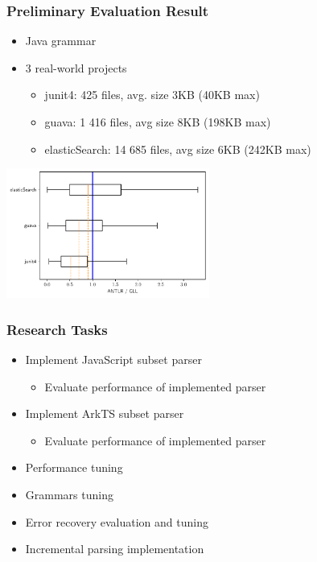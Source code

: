 \documentclass[xcolor=table,aspectratio=169]{beamer}
\begin{document}
\begin{frame}[fragile]
  \frametitle{Preliminary Evaluation Result}  
  \begin{itemize}
    \item Java grammar
    \item 3 real-world projects
    \begin{itemize}
      \item junit4: 425 files, avg. size 3KB (40KB max)
      \item guava:  1 416 files, avg size 8KB (198KB max)
      \item elasticSearch: 14 685 files, avg size 6KB (242KB max)
    \end{itemize}
  \end{itemize}
  \begin{center}
    \includegraphics[width=0.5\textwidth]{pictures/gll_results.pdf}
  \end{center}
  
\end{frame}

\begin{frame}[fragile]
  \frametitle{Research Tasks}  
  \begin{itemize}
    \item Implement JavaScript subset parser 
    \begin{itemize}
      \item Evaluate performance of implemented parser
    \end{itemize}    
    \item Implement ArkTS subset parser 
    \begin{itemize}
      \item Evaluate performance of implemented parser
    \end{itemize}
    \item Performance tuning
    \item Grammars tuning
    \item Error recovery evaluation and tuning
    \item Incremental parsing implementation
  \end{itemize}  
  
\end{frame}
\end{document}
